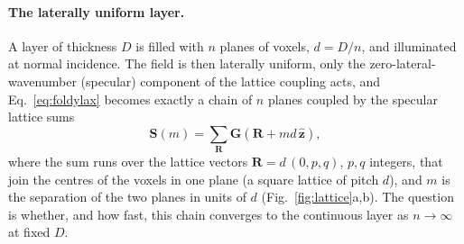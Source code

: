 \documentclass[extra,mreferee]{gji}
\newcommand{\bS}{\mathbf{S}}
\newcommand{\bG}{\mathbf{G}}
\begin{document}
\paragraph{The laterally uniform layer.} A layer of thickness $D$ is filled with $n$ planes of
voxels, $d=D/n$, and illuminated at normal incidence. The field is then laterally uniform, only the
zero-lateral-wavenumber (specular) component of the lattice coupling acts, and
Eq.~\eqref{eq:foldylax} becomes exactly a chain of $n$ planes coupled by the specular lattice sums
\begin{equation}\label{eq:specsum}
  \bS(m)=\sum_{\mathbf R}\bG(\mathbf R+m d\,\hat{\mathbf z}),
\end{equation}
where the sum runs over the lattice vectors $\mathbf R=d\,(0,p,q)$, $p,q$ integers, that join the centres of
the voxels in one plane (a square lattice of pitch $d$), and $m$ is the separation of the two planes in
units of $d$ (Fig.~\ref{fig:lattice}a,b). The question is whether, and how fast, this chain converges to the
continuous layer as $n\to\infty$ at fixed $D$.
\end{document}
